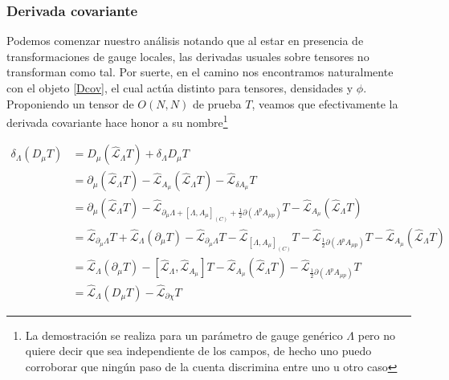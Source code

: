 \documentclass{article}
\numberwithin{equation}{section}
\begin{document}
\subsubsection{Derivada covariante}

Podemos comenzar nuestro análisis notando que al estar en presencia de transformaciones de gauge locales, las derivadas usuales sobre tensores no transforman como tal. Por suerte, en el camino nos encontramos naturalmente con el objeto \ref{Dcov}, el cual actúa distinto para tensores, densidades y $ \phi $. Proponiendo un tensor de $ O(N,N) $ de prueba $ T $, veamos que efectivamente la derivada covariante hace honor a su nombre\footnote{La demostración se realiza para un parámetro de gauge genérico $ \Lambda $ pero no quiere decir que sea independiente de los campos, de hecho uno puedo corroborar que ningún paso de la cuenta discrimina entre uno u otro caso}

\begin{equation}\label{Dcovdeduction}
\begin{aligned}
\delta_{\Lambda} \left( D_{\mu} T \right) &= D_{\mu} \left( \hat{\mathcal{L}}_{\Lambda} T\right) + \delta_{\Lambda} D_{\mu} T\\
&=\partial_{\mu} \left( \hat{\mathcal{L}}_{\Lambda} T \right) - \hat{\mathcal{L}}_{ A_{\mu}}\left( \hat{\mathcal{L}}_{\Lambda} T\right) - \hat{\mathcal{L}}_{\delta A_{\mu}} T\\
&= \partial_{\mu} \left( \hat{\mathcal{L}}_{\Lambda} T \right) - \hat{\mathcal{L}}_{\partial_{\mu} 
	\Lambda + \left[ \Lambda, A_{\mu}\right]_{(C)} + \frac{1}{2} \partial \left(\Lambda^p A_{\mu p} \right)}T - \hat{\mathcal{L}}_{ A_{\mu}}\left( \hat{\mathcal{L}}_{\Lambda} T\right)\\
&= \hat{\mathcal{L}}_{\partial_{\mu} \Lambda} T + \hat{\mathcal{L}}_{\Lambda} \left(\partial_{\mu}T\right) - \hat{\mathcal{L}}_{\partial_{\mu}\Lambda}T - \hat{\mathcal{L}}_{\left[ \Lambda, A_{\mu}\right]_{(C)}}T -\hat{\mathcal{L}}_{\frac{1}{2} \partial \left(\Lambda^p A_{\mu p} \right)}T- \hat{\mathcal{L}}_{ A_{\mu}}\left( \hat{\mathcal{L}}_{\Lambda} T\right)\\
&= \hat{\mathcal{L}}_{\Lambda} \left(\partial_{\mu}T\right) - \left[\hat{\mathcal{L}}_{\Lambda}, \hat{\mathcal{L}}_{A_{\mu}}\right] T - \hat{\mathcal{L}}_{ A_{\mu}}\left( \hat{\mathcal{L}}_{\Lambda} T\right) -\hat{\mathcal{L}}_{\frac{1}{2} \partial \left(\Lambda^p A_{\mu p} \right)}T\\
&= \hat{\mathcal{L}}_{\Lambda} \left( D_{\mu} T \right) -\hat{\mathcal{L}}_{\partial \chi}T
\end{aligned}
\end{equation}
\end{document}
